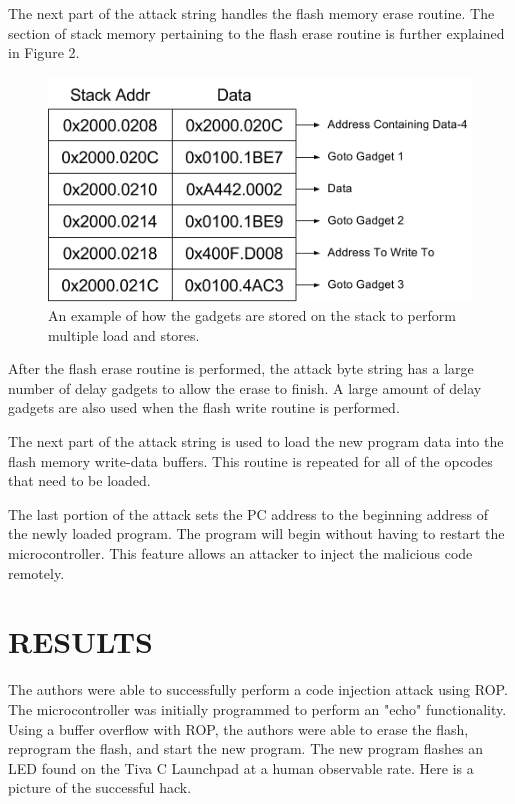 \documentclass[letterpaper, 10 pt, conference]{ieeeconf}  %
\begin{document}
The next part of the attack string handles the flash memory erase routine.  The section of stack memory pertaining to the flash erase routine is further explained in Figure 2.  

\begin{figure}[thpb]
	\centering
	\includegraphics[scale=.50]{RegisterWriting}
    \caption{An example of how the gadgets are stored on the stack to perform multiple load and stores.}
\end{figure}

After the flash erase routine is performed, the attack byte string has a large number of delay gadgets to allow the erase to finish.  A large amount of delay gadgets are also used when the flash write routine is performed.

The next part of the attack string is used to load the new program data into the flash memory write-data buffers.  This routine is repeated for all of the opcodes that need to be loaded.

The last portion of the attack sets the PC address to the beginning address of the newly loaded program.  The program will begin without having to restart the microcontroller.  This feature allows an attacker to inject the malicious code remotely.    

\section{RESULTS}

The authors were able to successfully perform a code injection attack using ROP.  The microcontroller was initially programmed to perform an "echo" functionality.  Using a buffer overflow with ROP, the authors were able to erase the flash, reprogram the flash, and start the new program.  The new program flashes an LED found on the Tiva C Launchpad at a human observable rate.  Here is a picture of the successful hack.
\end{document}
